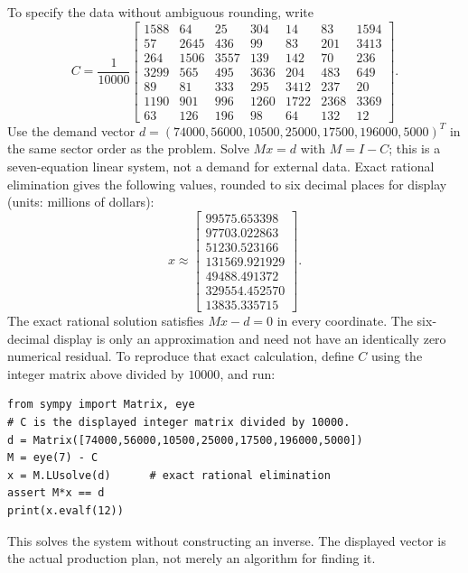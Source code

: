 To specify the data without ambiguous rounding, write
\[C=\frac1{10000}\left[\begin{matrix}1588 & 64 & 25 & 304 & 14 & 83 & 1594\\57 & 2645 & 436 & 99 & 83 & 201 & 3413\\264 & 1506 & 3557 & 139 & 142 & 70 & 236\\3299 & 565 & 495 & 3636 & 204 & 483 & 649\\89 & 81 & 333 & 295 & 3412 & 237 & 20\\1190 & 901 & 996 & 1260 & 1722 & 2368 & 3369\\63 & 126 & 196 & 98 & 64 & 132 & 12\end{matrix}\right].\]
Use the demand vector
$d=(74000,56000,10500,25000,17500,196000,5000)^T$ in the
same sector order as the problem. Solve $Mx=d$ with $M=I-C$;
this is a seven-equation linear system, not a demand for external data.
Exact rational elimination gives the following values, rounded to six
decimal places for display (units: millions of dollars):
\[x\approx\begin{bmatrix}99575.653398\\97703.022863\\51230.523166\\
131569.921929\\49488.491372\\329554.452570\\13835.335715\end{bmatrix}.\]
The exact rational solution satisfies $Mx-d=0$ in every coordinate.
The six-decimal display is only an approximation and need not have
an identically zero numerical residual.
To reproduce that exact calculation, define $C$ using the integer
matrix above divided by $10000$, and run:
\begin{verbatim}
from sympy import Matrix, eye
# C is the displayed integer matrix divided by 10000.
d = Matrix([74000,56000,10500,25000,17500,196000,5000])
M = eye(7) - C
x = M.LUsolve(d)      # exact rational elimination
assert M*x == d
print(x.evalf(12))
\end{verbatim}
This solves the system without constructing an inverse. The displayed
vector is the actual production plan, not merely an algorithm for finding it.

